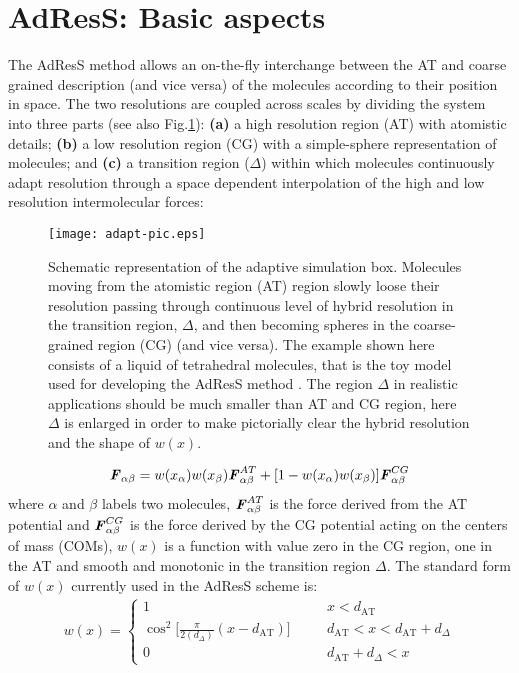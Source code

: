 \documentclass[aps,pre,preprint]{revtex4}
\renewcommand{\v}[1]{\textbf{\textit{#1}}}
\begin{document}
\section{AdResS: Basic aspects}
The  AdResS method allows an on-the-fly interchange between the AT and coarse grained description (and vice versa) of the molecules according to their position in space. 
The two resolutions are coupled across scales by dividing the system into three parts (see also Fig.\ref{adapt}): {\bf (a)}
a high resolution region (AT) with atomistic details; {\bf (b)} a low resolution region (CG) with a simple-sphere
representation of molecules; and {\bf (c)} a transition region ($\Delta$) within which molecules continuously
adapt resolution through a space dependent interpolation of the high and low resolution intermolecular
forces:
\begin{figure}
  \centering
  \texttt{[image: adapt-pic.eps]}
  \caption{Schematic representation of the adaptive simulation box. Molecules moving from the atomistic region (AT) region slowly loose their resolution passing through continuous level of hybrid resolution in the transition region, $\Delta$, and then becoming spheres in the coarse-grained region (CG) (and vice versa). The example shown here consists of a liquid of tetrahedral molecules, that is the toy model used for developing the AdResS method \cite{jcp}. The region $\Delta$ in realistic applications should be much smaller than AT and CG region, here $\Delta$ is enlarged in order to make pictorially clear the hybrid resolution and the shape of $w(x)$.}
  \label{adapt}
\end{figure} 
\begin{equation}
{\v F}_{\alpha \beta}=w(x_\alpha)w(x_\beta){\v F}_{\alpha\beta}^{AT}+[1-w(x_\alpha)w(x_\beta)]{\v F}^{CG}_{\alpha\beta}
\label{force}
\end{equation}
where $\alpha$ and $\beta$ labels two molecules, ${\v F}_{\alpha\beta}^{AT}$ is the force derived from the AT potential and ${\v F}^{CG}_{\alpha\beta}$ is the force derived by the CG potential acting on the centers of mass (COMs), $w(x)$ is a function with value zero in the CG region, one in the AT and smooth and monotonic in the transition region $\Delta$. The standard form of $w(x)$ currently used in the AdResS scheme is:
\begin{align}\label{eqn:old-w}
  w(x) =
  \left\{
    \begin{array}{lcl}
      1 &\quad& x < d_{\textrm{AT}}\\
      \cos^2\big[\frac{\pi}{2(d_{{\Delta}})} (x - d_{\textrm{AT}})\big] && d_{\textrm{AT}}  < x < d_{\textrm{AT}} + d_{{\Delta}} \\
      0 && d_{\textrm{AT}} + d_{{\Delta}}  < x
    \end{array}
  \right.
\end{align}
\end{document}
